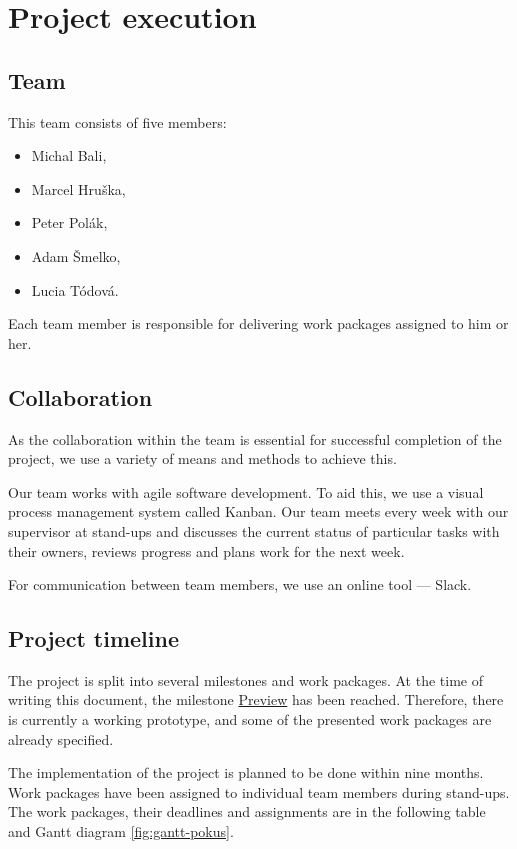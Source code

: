 \chapter{Project execution}

\section{Team}
This team consists of five members:

\begin{itemize}
	\item Michal Bali,
	\item Marcel Hruška,
	\item Peter Polák,
	\item Adam Šmelko,
	\item Lucia Tódová.
\end{itemize}

Each team member is responsible for delivering work packages assigned to him or her. 

\section{Collaboration}
As the collaboration within the team is essential for successful completion of the project, we use a variety of means and methods to achieve this. 

Our team works with agile software development. To aid this, we use a visual process management system called Kanban. Our team meets every week with our supervisor at stand-ups and discusses the current status of particular tasks with their owners, reviews progress and plans work for the next week.

For communication between team members, we use an online tool --- Slack.

\section{Project timeline}
The project is split into several milestones and work packages. At the time of writing this document,  the milestone \hyperref[milestone_preview]{Preview} has been reached. Therefore, there is currently a working prototype, and some of the presented work packages are already specified. 

The implementation of the project is planned to be done within nine months. Work packages have been assigned to individual team members during stand-ups. The work packages, their deadlines and assignments are in the following table and Gantt diagram \ref{fig:gantt-pokus}. 

